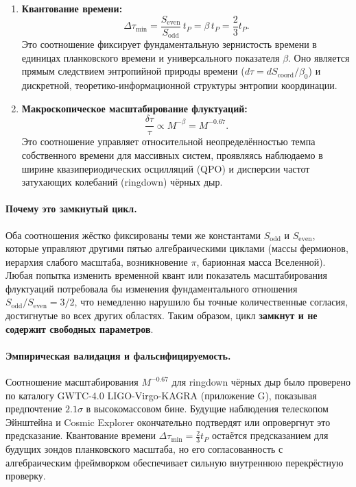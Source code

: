 \documentclass[12pt,a4paper]{article}
\begin{document}
	\begin{enumerate}
		\item \textbf{Квантование времени:}
		\begin{equation}
			\Delta \tau_{\min} = \frac{S_{\mathrm{even}}}{S_{\mathrm{odd}}} \, t_P = \beta \, t_P = \frac{2}{3} t_P.
			\label{eq:loop6-quantization}
		\end{equation}
		Это соотношение фиксирует фундаментальную зернистость времени в единицах планковского времени и универсального показателя \(\beta\). Оно является прямым следствием энтропийной природы времени (\(d\tau = dS_{\mathrm{coord}} / \beta_0\)) и дискретной, теоретико-информационной структуры энтропии координации.
		
		\item \textbf{Макроскопическое масштабирование флуктуаций:}
		\begin{equation}
			\frac{\delta \tau}{\tau} \propto M^{-\beta} = M^{-0.67}.
			\label{eq:loop6-fluctuation}
		\end{equation}
		Это соотношение управляет относительной неопределённостью темпа собственного времени для массивных систем, проявляясь наблюдаемо в ширине квазипериодических осцилляций (QPO) и дисперсии частот затухающих колебаний (ringdown) чёрных дыр.
	\end{enumerate}
	
	\paragraph{Почему это замкнутый цикл.}
	Оба соотношения жёстко фиксированы теми же константами \(S_{\mathrm{odd}}\) и \(S_{\mathrm{even}}\), которые управляют другими пятью алгебраическими циклами (массы фермионов, иерархия слабого масштаба, возникновение \(\pi\), барионная масса Вселенной). Любая попытка изменить временной квант или показатель масштабирования флуктуаций потребовала бы изменения фундаментального отношения \(S_{\mathrm{odd}}/S_{\mathrm{even}} = 3/2\), что немедленно нарушило бы точные количественные согласия, достигнутые во всех других областях. Таким образом, цикл \textbf{замкнут и не содержит свободных параметров}.
	
	\paragraph{Эмпирическая валидация и фальсифицируемость.}
	Соотношение масштабирования \(M^{-0.67}\) для ringdown чёрных дыр было проверено по каталогу GWTC-4.0 LIGO-Virgo-KAGRA (приложение G), показывая предпочтение \(2.1\sigma\) в высокомассовом бине. Будущие наблюдения телескопом Эйнштейна и Cosmic Explorer окончательно подтвердят или опровергнут это предсказание. Квантование времени \(\Delta \tau_{\min} = \frac{2}{3} t_P\) остаётся предсказанием для будущих зондов планковского масштаба, но его согласованность с алгебраическим фреймворком обеспечивает сильную внутреннюю перекрёстную проверку.
	
\end{document}
